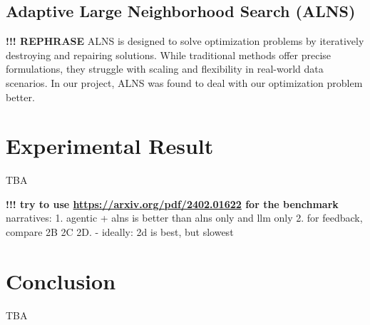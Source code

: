 \documentclass{ecai}
\newtheorem{theorem}{Theorem}
\begin{document}
\subsection{Adaptive Large Neighborhood Search (ALNS)}
\textbf{!!! REPHRASE} ALNS is designed to solve optimization problems by iteratively destroying and repairing solutions. While traditional methods offer precise formulations, they struggle with scaling and flexibility in real-world data scenarios. In our project, ALNS was found to deal with our optimization problem better.

\section{Experimental Result}
TBA

\textbf{!!! try to use \url{https://arxiv.org/pdf/2402.01622} for the benchmark}
narratives:
1. agentic + alns is better than alns only and llm only
2. for feedback, compare 2B 2C 2D.
    - ideally: 2d is best, but slowest

\section{Conclusion}
TBA





\end{document}
